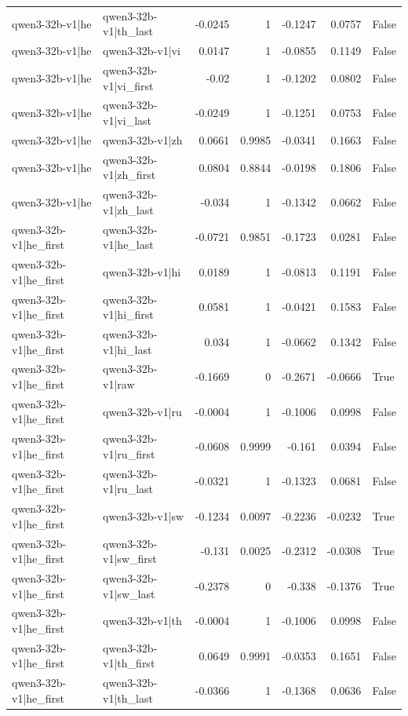 \begin{table}
\begin{tabular}{l l r r r r l}
qwen3-32b-v1|he & qwen3-32b-v1|th_last & -0.0245 & 1 & -0.1247 & 0.0757 & False \\
qwen3-32b-v1|he & qwen3-32b-v1|vi & 0.0147 & 1 & -0.0855 & 0.1149 & False \\
qwen3-32b-v1|he & qwen3-32b-v1|vi_first & -0.02 & 1 & -0.1202 & 0.0802 & False \\
qwen3-32b-v1|he & qwen3-32b-v1|vi_last & -0.0249 & 1 & -0.1251 & 0.0753 & False \\
qwen3-32b-v1|he & qwen3-32b-v1|zh & 0.0661 & 0.9985 & -0.0341 & 0.1663 & False \\
qwen3-32b-v1|he & qwen3-32b-v1|zh_first & 0.0804 & 0.8844 & -0.0198 & 0.1806 & False \\
qwen3-32b-v1|he & qwen3-32b-v1|zh_last & -0.034 & 1 & -0.1342 & 0.0662 & False \\
qwen3-32b-v1|he_first & qwen3-32b-v1|he_last & -0.0721 & 0.9851 & -0.1723 & 0.0281 & False \\
qwen3-32b-v1|he_first & qwen3-32b-v1|hi & 0.0189 & 1 & -0.0813 & 0.1191 & False \\
qwen3-32b-v1|he_first & qwen3-32b-v1|hi_first & 0.0581 & 1 & -0.0421 & 0.1583 & False \\
qwen3-32b-v1|he_first & qwen3-32b-v1|hi_last & 0.034 & 1 & -0.0662 & 0.1342 & False \\
qwen3-32b-v1|he_first & qwen3-32b-v1|raw & -0.1669 & 0 & -0.2671 & -0.0666 & True \\
qwen3-32b-v1|he_first & qwen3-32b-v1|ru & -0.0004 & 1 & -0.1006 & 0.0998 & False \\
qwen3-32b-v1|he_first & qwen3-32b-v1|ru_first & -0.0608 & 0.9999 & -0.161 & 0.0394 & False \\
qwen3-32b-v1|he_first & qwen3-32b-v1|ru_last & -0.0321 & 1 & -0.1323 & 0.0681 & False \\
qwen3-32b-v1|he_first & qwen3-32b-v1|sw & -0.1234 & 0.0097 & -0.2236 & -0.0232 & True \\
qwen3-32b-v1|he_first & qwen3-32b-v1|sw_first & -0.131 & 0.0025 & -0.2312 & -0.0308 & True \\
qwen3-32b-v1|he_first & qwen3-32b-v1|sw_last & -0.2378 & 0 & -0.338 & -0.1376 & True \\
qwen3-32b-v1|he_first & qwen3-32b-v1|th & -0.0004 & 1 & -0.1006 & 0.0998 & False \\
qwen3-32b-v1|he_first & qwen3-32b-v1|th_first & 0.0649 & 0.9991 & -0.0353 & 0.1651 & False \\
qwen3-32b-v1|he_first & qwen3-32b-v1|th_last & -0.0366 & 1 & -0.1368 & 0.0636 & False \\

\end{tabular}
\end{table}
